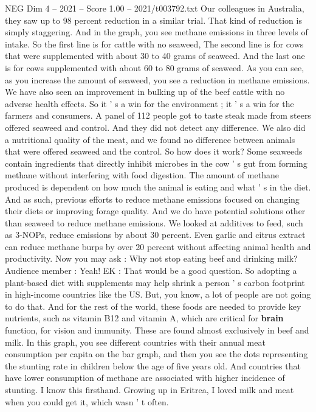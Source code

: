\begin{textsample}{NEG Dim 4 – 2021 – Score 1.00 – 2021/t003792.txt}
Our colleagues in Australia, they saw up to 98 percent reduction in a similar trial.
That kind of reduction is simply staggering.
And in the graph, you see methane emissions in three levels of intake.
So the first line is for cattle with no seaweed, The second line is for cows that were supplemented with about 30 to 40 grams of seaweed.
And the last one is for cows supplemented with about 60 to 80 grams of seaweed.
As you can see, as you increase the amount of seaweed, you see a reduction in methane emissions.
We have also seen an improvement in bulking up of the beef cattle with no adverse health effects.
So it ' s a win for the environment ; it ' s a win for the farmers and consumers.
A panel of 112 people got to taste steak made from steers offered seaweed and control.
And they did not detect any difference.
We also did a nutritional quality of the meat, and we found no difference between animals that were offered seaweed and the control.
So how does it work?
Some seaweeds contain ingredients that directly inhibit microbes in the cow ' s gut from forming methane without interfering with food digestion.
The amount of methane produced is dependent on how much the animal is eating and what ' s in the diet.
And as such, previous efforts to reduce methane emissions focused on changing their diets or improving forage quality.
And we do have potential solutions other than seaweed to reduce methane emissions.
We looked at additives to feed, such as 3-NOPs, reduce emissions by about 30 percent.
Even garlic and citrus extract can reduce methane burps by over 20 percent without affecting animal health and productivity.
Now you may ask : Why not stop eating beef and drinking milk?
Audience member : Yeah!
EK : That would be a good question.
So adopting a plant-based diet with supplements may help shrink a person ' s carbon footprint in high-income countries like the US.
But, you know, a lot of people are not going to do that.
And for the rest of the world, these foods are needed to provide key nutrients, such as vitamin B12 and vitamin A, which are critical for \textbf{brain} function, for vision and immunity.
These are found almost exclusively in beef and milk.
In this graph, you see different countries with their annual meat consumption per capita on the bar graph, and then you see the dots representing the stunting rate in children below the age of five years old.
And countries that have lower consumption of methane are associated with higher incidence of stunting.
I know this firsthand.
Growing up in Eritrea, I loved milk and meat when you could get it, which wasn ' t often.

\end{textsample}
